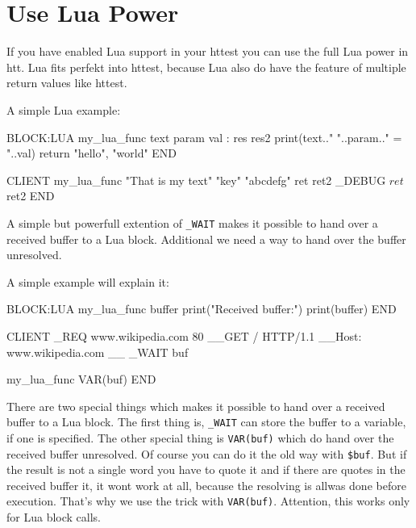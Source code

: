 \section{Use Lua Power}

If you have enabled Lua support in your httest you can use the full Lua
power in htt. Lua fits perfekt into httest, because Lua also do have the feature
of multiple return values like httest. 

A simple Lua example:

\begin{usplisting}
    BLOCK:LUA my_lua_func text param val : res res2
      print(text.." "..param.." = "..val)
      return "hello", "world"
    END
      
    CLIENT
      my_lua_func "That is my text" "key" "abcdefg" ret ret2
      _DEBUG $ret $ret2
    END
\end{usplisting}

A simple but powerfull extention of \texttt{\_WAIT} makes it possible to hand over a
received buffer to a Lua block. Additional we need a way to hand over the buffer
unresolved. 

A simple example will explain it:

\begin{usplisting}
    BLOCK:LUA my_lua_func buffer
      print("Received buffer:")
      print(buffer)
    END
      
    CLIENT
      _REQ www.wikipedia.com 80
      __GET / HTTP/1.1
      __Host: www.wikipedia.com
      __
      _WAIT buf
      
      my_lua_func VAR(buf)
    END
\end{usplisting}

There are two special things which makes it possible to hand over a received 
buffer to a Lua block. The first thing is, \texttt{\_WAIT} can store the buffer to a
variable, if one is specified. The other special thing is \texttt{VAR(buf)}
which do hand over the received buffer unresolved. Of course you can do it
the old way with \texttt{\$buf}. But if the result is not a single word you have
to quote it and if there are quotes in the received buffer it, it wont work at all,
because the resolving is allwas done before execution. That's why we use
the trick with \texttt{VAR(buf)}. Attention, this works only for Lua block calls.

